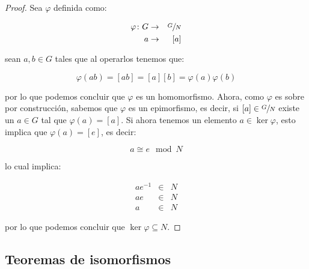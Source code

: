         \begin{proof}
            Sea $\varphi$ definida como:

            \begin{eqnarray*}
                \varphi \colon G & \to & \sfrac{G}{N} \\
                a & \to & [a]
            \end{eqnarray*}

            sean $a, b \in G$ tales que al operarlos tenemos que:

            \begin{equation*}
                \varphi(ab) = [ab] = [a][b] = \varphi(a)\varphi(b)
            \end{equation*}

            por lo que podemos concluir que $\varphi$ es un homomorfismo.
            Ahora, como $\varphi$ es sobre por construcción, sabemos que $\varphi$ es un epimorfismo, es decir, si $[a] \in \sfrac{G}{N}$ existe un $a \in G$ tal que $\varphi(a) = [a]$.
            Si ahora tenemos un elemento $a \in \ker{\varphi}$, esto implica que $\varphi(a) = [e]$, es decir:

            \begin{equation*}
                a \cong e \mod N
            \end{equation*}

            lo cual implica:

            \begin{eqnarray*}
                a e^{-1} & \in & N \\
                a e & \in & N \\
                a & \in & N
            \end{eqnarray*}

            por lo que podemos concluir que $\ker{\varphi} \subseteq N$.
        \end{proof}


    \subsection{Teoremas de isomorfismos}

        


